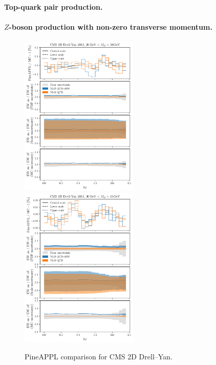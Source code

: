 \paragraph{Top-quark pair production.}


\paragraph{$Z$-boson production with non-zero transverse momentum.}


\begin{figure}
    \centering
    \includegraphics[width=0.5\textwidth]{figures/pineappl_CMSDY2D11_bin1}%
    \includegraphics[width=0.5\textwidth]{figures/pineappl_CMSDY2D11_bin2}
    \caption{PineAPPL comparison for CMS 2D Drell--Yan.}
    \label{fig:cmsdy2d11_bins12}
\end{figure}

